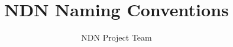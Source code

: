 \documentclass[10pt]{article}
\begin{document}
\title{NDN Naming Conventions}
\author{NDN Project Team}
\maketitle











\end{document}
